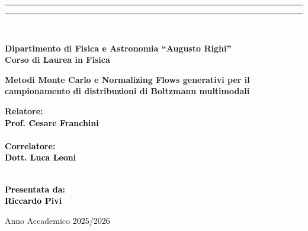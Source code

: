 \documentclass[12pt,twoside,openright]{book}
\begin{document}
\begin{titlepage}
\begin{center}
\rule[0.1cm]{\textwidth}{0.1mm}
\rule[0.5cm]{\textwidth}{0.6mm}
\\\vspace{3mm}

{\small{\bf Dipartimento di Fisica e Astronomia “Augusto Righi”\\
Corso di Laurea in Fisica}}

\end{center}

\vspace{23mm}

\begin{center}
\begin{minipage}{0.85\textwidth}
\centering
{\LARGE\bfseries\linespread{1.15}\selectfont
Metodi Monte Carlo e Normalizing Flows generativi per il campionamento di distribuzioni di Boltzmann multimodali\par}
\end{minipage}
\end{center}

\vspace{50mm} \par \noindent

\begin{minipage}[t]{0.47\textwidth}

{\large{\bf Relatore: \vspace{2mm}\\\textcolor{black}{
Prof. Cesare Franchini}\\\\
\textcolor{black}{
\bf Correlatore:
\vspace{2mm}\\
Dott. Luca Leoni\\\\}}}
\end{minipage}
%
\hfill
%
\begin{minipage}[t]{0.47\textwidth}\raggedleft \textcolor{black}{
{\large{\bf Presentata da:
\vspace{2mm}\\
Riccardo Pivi}}}
\end{minipage}

\vfill

\begin{center}
Anno Accademico \textcolor{black}{ 2025/2026}
\end{center}
\end{titlepage}
\end{document}
